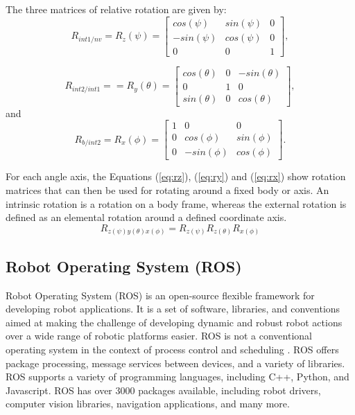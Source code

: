 The three matrices of relative rotation are given by:
\begin{equation}
    R_{int1/nv} = R_{z}(\psi) = \begin{bmatrix}
cos(\psi)  & sin(\psi) & 0\\ 
-sin(\psi) & cos(\psi) & 0 \\ 
0 & 0 & 1
\end{bmatrix},
\end{equation}\label{eq:rz}

\begin{equation}
    R_{int2/int1} = = R_{y}(\theta) =  \begin{bmatrix}
cos(\theta)  & 0 & -sin(\theta)\\ 
0 & 1 & 0 \\ 
sin(\theta) & 0 & cos(\theta)
\end{bmatrix},
\end{equation}\label{eq:ry}
and 
\begin{equation}
    R_{b/int2} = R_{x}(\phi) =\begin{bmatrix}
1  & 0 & 0\\ 
0 & cos(\phi) & sin(\phi) \\ 
0 & -sin(\phi) & cos(\phi)
\end{bmatrix}.
\end{equation}\label{eq:rx}


For each angle axis, the Equations (\ref{eq:rz}), (\ref{eq:ry}) and (\ref{eq:rx})  show rotation matrices that can then be used for rotating around a fixed body or axis. An intrinsic rotation is a rotation on a body frame, whereas the external rotation is defined as an elemental rotation around a defined coordinate axis.
\begin{equation}
    R_{z(\psi)y(\theta)x(\phi)} = R_{z(\psi)} R_{z(\theta)}R_{x(\phi)}
\end{equation}


\subsection{Robot Operating System (ROS)}
Robot Operating System (ROS) is an open-source flexible framework for developing robot applications. It is a set of software, libraries, and conventions aimed at making the challenge of developing dynamic and robust robot actions over a wide range of robotic platforms easier. ROS is not a conventional operating system in the context of process control and scheduling \cite{quigley_ros_2009}. ROS offers package processing, message services between devices, and a variety of libraries. ROS supports a variety of programming languages, including C++, Python, and Javascript. ROS has over 3000 packages available, including robot drivers, computer vision libraries, navigation applications, and many more.

